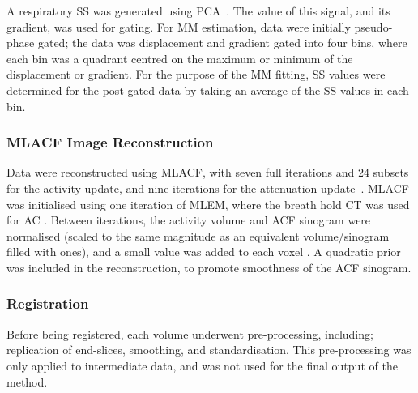                 A respiratory \gls{SS} was generated using \gls{PCA}~\parencite{Thielemans2011}. The value of this signal, and its gradient, was used for gating. For \gls{MM} estimation, data were initially pseudo-phase gated; the data was displacement and gradient gated into four bins, where each bin was a quadrant centred on the maximum or minimum of the displacement or gradient. %
                For the purpose of the \gls{MM} fitting, \gls{SS} values were determined for the post-gated data by taking an average of the \gls{SS} values in each bin.
                
            \subsubsection{MLACF Image Reconstruction} \label{sec:pet_ct_motion_correction_exploiting_motion_models_fit_on_coarsely_gated_data_applied_to_finely_gated_data_methods_mlacf_image_reconstruction}
                Data were reconstructed using \gls{MLACF}, with seven full iterations and $24$ subsets for the activity update, and nine iterations for the attenuation update~\parencite{Nuyts2012ML-reconstructionFactors}. \gls{MLACF} was initialised using one iteration of \gls{MLEM}, where the breath hold \gls{CT} was used for \gls{AC}%
                . Between iterations, the activity volume and \gls{ACF} sinogram were normalised (scaled to the same magnitude as an equivalent volume/sinogram filled with ones), and a small value was added to each voxel%
                . A quadratic prior was included in the reconstruction, to promote smoothness of the \gls{ACF} sinogram.
            
            
            \subsubsection{Registration} \label{sec:pet_ct_motion_correction_exploiting_motion_models_fit_on_coarsely_gated_data_applied_to_finely_gated_data_methods_registration}
                Before being registered, each volume underwent pre-processing, including; replication of end-slices, smoothing, and standardisation. This pre-processing was only applied to intermediate data, and was not used for the final output of the method.
                
